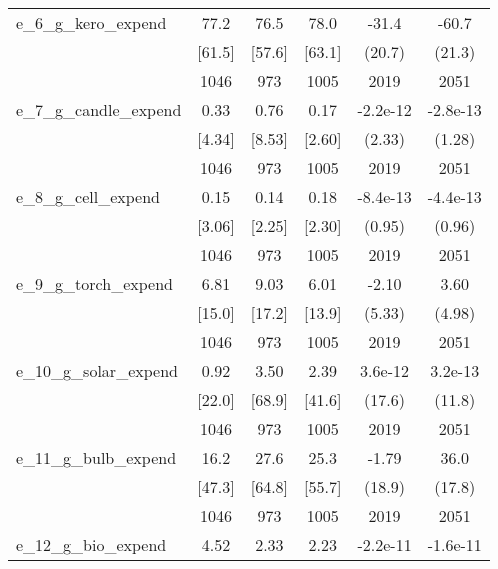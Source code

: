 \begin{table}[htbp]
\begin{tabular*}{0.9\hsize}{@{\hskip\tabcolsep\extracolsep\fill}l*{1}{ccccc}}
e\_6\_g\_kero\_expend               &     77.2&     76.5&     78.0&    -31.4         &    -60.7\sym{***}\\
                                &   [61.5]&   [57.6]&   [63.1]&   (20.7)         &   (21.3)         \\
                                &     1046&      973&     1005&     2019         &     2051         \\
e\_7\_g\_candle\_expend             &     0.33&     0.76&     0.17& -2.2e-12         & -2.8e-13         \\
                                &   [4.34]&   [8.53]&   [2.60]&   (2.33)         &   (1.28)         \\
                                &     1046&      973&     1005&     2019         &     2051         \\
e\_8\_g\_cell\_expend               &     0.15&     0.14&     0.18& -8.4e-13         & -4.4e-13         \\
                                &   [3.06]&   [2.25]&   [2.30]&   (0.95)         &   (0.96)         \\
                                &     1046&      973&     1005&     2019         &     2051         \\
e\_9\_g\_torch\_expend              &     6.81&     9.03&     6.01&    -2.10         &     3.60         \\
                                &   [15.0]&   [17.2]&   [13.9]&   (5.33)         &   (4.98)         \\
                                &     1046&      973&     1005&     2019         &     2051         \\
e\_10\_g\_solar\_expend             &     0.92&     3.50&     2.39&  3.6e-12         &  3.2e-13         \\
                                &   [22.0]&   [68.9]&   [41.6]&   (17.6)         &   (11.8)         \\
                                &     1046&      973&     1005&     2019         &     2051         \\
e\_11\_g\_bulb\_expend              &     16.2&     27.6&     25.3&    -1.79         &     36.0\sym{**} \\
                                &   [47.3]&   [64.8]&   [55.7]&   (18.9)         &   (17.8)         \\
                                &     1046&      973&     1005&     2019         &     2051         \\
e\_12\_g\_bio\_expend               &     4.52&     2.33&     2.23& -2.2e-11         & -1.6e-11         \\

\end{tabular*}
\end{table}
